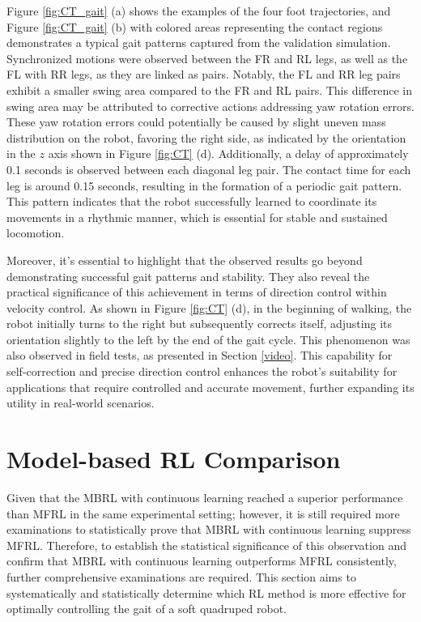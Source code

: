 Figure \ref{fig:CT_gait} (a) shows the examples of the four foot trajectories, and Figure \ref{fig:CT_gait} (b) with colored areas representing the contact regions demonstrates a typical gait patterns captured from the validation simulation. Synchronized motions were observed between the FR and RL legs, as well as the FL with RR legs, as they are linked as pairs. Notably, the FL and RR leg pairs exhibit a smaller swing area compared to the FR and RL pairs. This difference in swing area may be attributed to corrective actions addressing yaw rotation errors. These yaw rotation errors could potentially be caused by slight uneven mass distribution on the robot, favoring the right side, as indicated by the orientation in the $z$ axis shown in Figure \ref{fig:CT} (d). Additionally, a delay of approximately 0.1 seconds is observed between each diagonal leg pair. The contact time for each leg is around 0.15 seconds, resulting in the formation of a periodic gait pattern. This pattern indicates that the robot successfully learned to coordinate its movements in a rhythmic manner, which is essential for stable and sustained locomotion.



Moreover, it's essential to highlight that the observed results go beyond demonstrating successful gait patterns and stability. They also reveal the practical significance of this achievement in terms of direction control within velocity control. As shown in Figure \ref{fig:CT} (d), in the beginning of walking, the robot initially turns to the right but subsequently corrects itself, adjusting its orientation slightly to the left by the end of the gait cycle. This phenomenon was also observed in field tests, as presented in Section \ref{video}. This capability for self-correction and precise direction control enhances the robot's suitability for applications that require controlled and accurate movement, further expanding its utility in real-world scenarios. 

\section{Model-based RL Comparison}
\label{Sec:MBRL}
Given that the MBRL with continuous learning reached a superior performance than MFRL in the same experimental setting; however, it is still required more examinations to statistically prove that MBRL with continuous learning suppress MFRL. Therefore, to establish the statistical significance of this observation and confirm that MBRL with continuous learning outperforms MFRL consistently, further comprehensive examinations are required. This section aims to systematically and statistically determine which RL method is more effective for optimally controlling the gait of a soft quadruped robot. 

